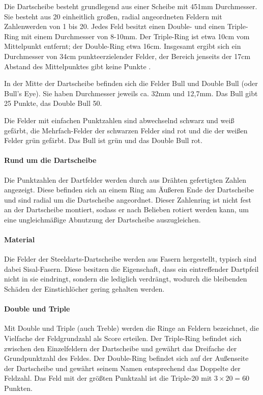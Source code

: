 Die Dartscheibe besteht grundlegend aus einer Scheibe mit 451mm Durchmesser. Sie besteht aus 20 einheitlich großen, radial angeordneten Feldern mit Zahlenwerden von 1 bis 20. Jedes Feld besitzt einen Double- und einen Triple-Ring mit einem Durchmesser von 8-10mm. Der Triple-Ring ist etwa 10cm vom Mittelpunkt entfernt; der Double-Ring etwa 16cm. Insgesamt ergibt sich ein Durchmesser von 34cm punkteerzielender Felder, der Bereich jenseits der 17cm Abstand des Mittelpunktes gibt keine Punkte \cite{wdf-rules}.

In der Mitte der Dartscheibe befinden sich die Felder Bull und Double Bull (oder Bull's Eye). Sie haben Durchmesser jeweils ca. 32mm und 12,7mm. Das Bull gibt 25 Punkte, das Double Bull 50.

Die Felder mit einfachen Punktzahlen sind abwechselnd schwarz und weiß gefärbt, die Mehrfach-Felder der schwarzen Felder sind rot und die der weißen Felder grün gefärbt. Das Bull ist grün und das Double Bull rot.

\paragraph{Rund um die Dartscheibe}

Die Punktzahlen der Dartfelder werden durch aus Drähten gefertigten Zahlen angezeigt. Diese befinden sich an einem Ring am Äußeren Ende der Dartscheibe und sind radial um die Dartscheibe angeordnet. Dieser Zahlenring ist nicht fest an der Dartscheibe montiert, sodass er nach Belieben rotiert werden kann, um eine ungleichmäßige Abnutzung der Dartscheibe auszugleichen.

\paragraph{Material}

Die Felder der Steeldarts-Dartscheibe werden aus Fasern hergestellt, typisch sind dabei Sisal-Fasern. Diese besitzen die Eigenschaft, dass ein eintreffender Dartpfeil nicht in sie eindringt, sondern die lediglich verdrängt, wodurch die bleibenden Schäden der Einstichlöcher gering gehalten werden.

\paragraph{Double und Triple}

Mit Double und Triple (auch Treble) werden die Ringe an Feldern bezeichnet, die Vielfache der Feldgrundzahl als Score erteilen. Der Triple-Ring befindet sich zwischen den Einzelfeldern der Dartscheibe und gewährt das Dreifache der Grundpunktzahl des Feldes. Der Double-Ring befindet sich auf der Außenseite der Dartscheibe und gewährt seinem Namen entsprechend das Doppelte der Feldzahl. Das Feld mit der größten Punktzahl ist die Triple-20 mit $3 \times 20 = 60$ Punkten.

